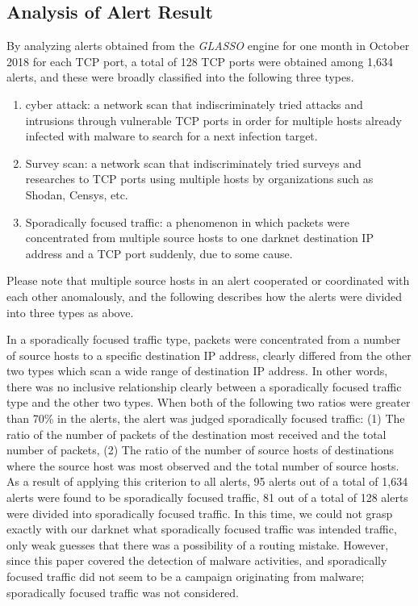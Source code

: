 \documentclass[conference]{IEEEtran}
\begin{document}
\subsection{Analysis of Alert Result}
By analyzing alerts obtained from the {\it GLASSO} engine for one month in October 2018 for each TCP port, a total of 128 TCP ports were obtained among 1,634 alerts, and these were broadly classified into the following three types.
\begin{enumerate}
  \item cyber attack: a network scan that indiscriminately tried attacks and intrusions through vulnerable TCP ports in order for multiple hosts already infected with malware to search for a next infection target.
  \item Survey scan: a network scan that indiscriminately tried surveys and researches to TCP ports using multiple hosts by organizations such as Shodan, Censys, etc.
  \item Sporadically focused traffic: a phenomenon in which packets were concentrated from multiple source hosts to one darknet destination IP address and a TCP port suddenly, due to some cause.
\end{enumerate}
Please note that multiple source hosts in an alert cooperated or coordinated with each other anomalously, and the following describes how the alerts were divided into three types as above.


In a sporadically focused traffic type, packets were concentrated from a number of source hosts to a specific destination IP address, clearly differed from the other two types which scan a wide range of destination IP address.
In other words, there was no inclusive relationship clearly between a sporadically focused traffic type and the other two types.
When both of the following two ratios were greater than 70\% in the alerts, the alert was judged sporadically focused traffic: (1) The ratio of the number of packets of the destination most received and the total number of packets, (2) The ratio of the number of source hosts of destinations where the source host was most observed and the total number of source hosts.
As a result of applying this criterion to all alerts, 95 alerts out of a total of 1,634 alerts were found to be sporadically focused traffic, 81 out of a total of 128 alerts were divided into sporadically focused traffic.
In this time, we could not grasp exactly with our darknet what sporadically focused traffic was intended traffic, only weak guesses that there was a possibility of a routing mistake.
However, since this paper covered the detection of malware activities, and sporadically focused traffic did not seem to be a campaign originating from malware; sporadically focused traffic was not considered.
\end{document}
